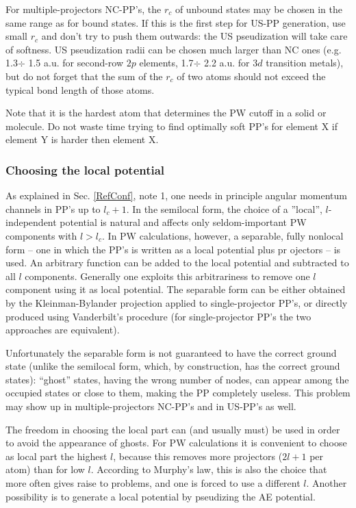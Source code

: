 \documentclass[12pt,a4paper]{article}
\begin{document}
For multiple-projectors NC-PP's, the $r_c$ of unbound states may be chosen 
in the same range as for bound states. If this is the first step for US-PP 
generation, use small $r_c$ and don't try to push them outwards: the
US pseudization will take care of softness. US pseudization radii can 
be chosen much larger than NC ones (e.g. 1.3$\div$ 1.5 a.u. for second-row
$2p$ elements, 1.7$\div$ 2.2 a.u. for $3d$ transition metals), but do not
forget that the sum of the $r_c$ of two atoms should not exceed the typical
bond length of those atoms.

Note that it is the hardest atom that determines the PW cutoff in a
solid or molecule. Do not waste time trying to find optimally soft 
PP's for element X if element Y is harder then element X.

\subsubsection{Choosing the local potential}

As explained in Sec. \ref{RefConf}, note 1, one needs in principle
angular momentum channels in PP's up to $l_c+1$. In the semilocal
form, the choice of a ''local'', $l$-independent potential is natural
and affects only seldom-important PW components with $l> l_c$.
In PW calculations, however, a separable, fully nonlocal form -- 
one in which the PP's is written as a local potential plus pr
ojectors -- is used.
An arbitrary function can be added to the local potential and 
subtracted to all $l$ components. Generally one exploits this 
arbitrariness to remove one $l$ component using it as local potential.
The separable form can be either obtained by the Kleinman-Bylander
projection \cite{KB} applied to single-projector PP's, or directly 
produced using Vanderbilt's procedure \cite{van} (for single-projector
PP's the two approaches are equivalent).

Unfortunately the separable form is not guaranteed to have the
correct ground state (unlike the semilocal form, which, by construction,
has the correct ground states): ``ghost'' states, having the wrong number 
of nodes, 
can appear among the occupied states or close to them, making the 
PP completely useless. This problem may show up in multiple-projectors 
NC-PP's and in US-PP's as well.

The freedom in choosing the local part can (and usually must) be used 
in order to avoid the appearance of ghosts. For PW calculations it is 
convenient to choose as local part the highest $l$, because this removes
more projectors ($2l+1$ per atom) than for low $l$. According to Murphy's 
law, this is also the choice that more often gives raise to problems, 
and one is forced to use a different $l$. Another possibility is to generate 
a local potential by pseudizing the AE potential.
\end{document}

